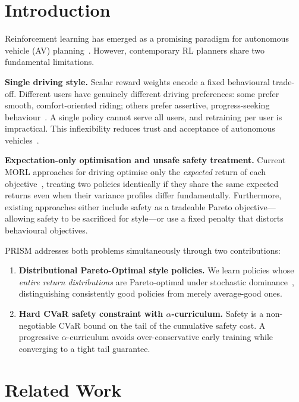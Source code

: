 \documentclass[conference]{IEEEtran}
\begin{document}
\section{Introduction}\label{sec:intro}

Reinforcement learning has emerged as a promising paradigm for
autonomous vehicle (AV) planning~\cite{CaRL2025,PDM2023}. However,
contemporary RL planners share two fundamental limitations.

\textbf{Single driving style.}
Scalar reward weights encode a fixed behavioural trade-off. Different
users have genuinely different driving preferences: some prefer smooth,
comfort-oriented riding; others prefer assertive, progress-seeking
behaviour~\cite{Yusof2016,Vasile2023}. A single policy cannot serve all
users, and retraining per user is impractical. This inflexibility
reduces trust and acceptance of autonomous
vehicles~\cite{Haselberger2024}.

\textbf{Expectation-only optimisation and unsafe safety treatment.}
Current MORL approaches for driving optimise only the \emph{expected}
return of each objective~\cite{Surmann2025}, treating two policies
identically if they share the same expected returns even when their
variance profiles differ fundamentally. Furthermore, existing approaches
either include safety as a tradeable Pareto objective---allowing safety
to be sacrificed for style---or use a fixed penalty that distorts
behavioural objectives.

PRISM addresses both problems simultaneously through two contributions:

\begin{enumerate}
  \item \textbf{Distributional Pareto-Optimal style policies.}
    We learn policies whose \emph{entire return distributions} are
    Pareto-optimal under stochastic dominance~\cite{DPMORL2023},
    distinguishing consistently good policies from merely
    average-good ones.

  \item \textbf{Hard CVaR safety constraint with $\alpha$-curriculum.}
    Safety is a non-negotiable CVaR bound on the tail of the cumulative
    safety cost. A progressive $\alpha$-curriculum avoids over-conservative
    early training while converging to a tight tail guarantee.
\end{enumerate}

\section{Related Work}\label{sec:related}
\end{document}
